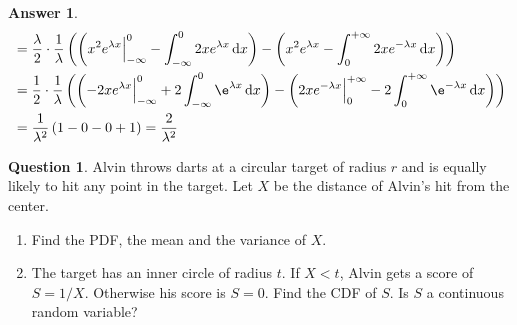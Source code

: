 \documentclass[utf8]{article}
\theoremstyle{definition}%
\newtheorem{question}{Question} %
\theoremstyle{plain}%
\newtheorem{answer}{Answer} %
\begin{document}
\begin{answer}
\begin{align}
\begin{aligned}
        &= \frac{\lambda}{2}\cdot\frac{1}{\lambda} \left(\left(x^2e^{\lambda x}\Big|_{-\infty}^{0} - \int_{-\infty}^{0}2xe^{\lambda x}\dd{x}\right) - \left(x^2e^{\lambda x} - \int_{0}^{+\infty}2xe^{-\lambda x}\dd{x}\right)\right) \\
        &= \frac{1}{2} \cdot \frac{1}{\lambda} \left(\left(-2xe^{\lambda x}\Big|_{-\infty}^{0} + 2\int_{-\infty}^{0}\e^{\lambda x}\dd{x}\right) - \left(2xe^{-\lambda x}\Big|_{0}^{+\infty} - 2\int_{0}^{+\infty}\e^{-\lambda x}\dd{x}\right)\right) \\
        &= \frac{1}{\lambda^2} \left(1 - 0 - 0 + 1\right) = \frac{2}{\lambda^2}
    \end{aligned}
    \end{align}
\end{answer}

\begin{question}
    Alvin throws darts at a circular target of radius $r$ and is equally likely to hit any point in the target. Let $X$ be the distance of Alvin's hit from the center.
    \begin{enumerate}[label=(\alph*)]
        \item Find the PDF, the mean and the variance of $X$.
        \item The target has an inner circle of radius $t$. If $X < t$, Alvin gets a score of $S = 1/X$. Otherwise his score is $S = 0$. Find the CDF of $S$. Is $S$ a continuous random variable?
    \end{enumerate}
\end{question}
\end{document}

